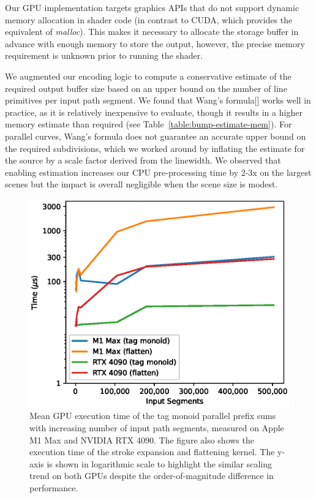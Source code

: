 \documentclass[sigconf, authordraft]{acmart}
\begin{document}
Our GPU implementation targets graphics APIs that do not support dynamic memory allocation in shader code (in contrast to CUDA, which provides the equivalent of \emph{malloc}). This makes it necessary to allocate the storage buffer in advance with enough memory to store the output, however, the precise memory requirement is unknown prior to running the shader.

We augmented our encoding logic to compute a conservative estimate of the required output buffer size based on an upper bound on the number of line primitives per input path segment. We found that Wang's formula[] works well in practice, as it is relatively inexpensive to evaluate, though it results in a higher memory estimate than required (see Table~\ref{table:bump-estimate-mem}). For parallel curves, Wang's formula does not guarantee an accurate upper bound on the required subdivisions, which we worked around by inflating the estimate for the source by a scale factor derived from the linewidth. We observed that enabling estimation increases our CPU pre-processing time by 2-3x on the largest scenes but the impact is overall negligible when the scene size is modest.

\begin{figure}
    \includegraphics[scale=0.66]{tag_monoid_gpu_timings}
    \caption{Mean GPU execution time of the tag monoid parallel prefix sums with increasing number of input path segments, measured on Apple M1 Max and NVIDIA RTX 4090. The figure also shows the execution time of the stroke expansion and flattening kernel. The y-axis is shown in logarithmic scale to highlight the similar scaling trend on both GPUs despite the order-of-magnitude difference in performance.}
    \label{fig:tag-monoid-gpu-timings}
\end{figure}
\end{document}
